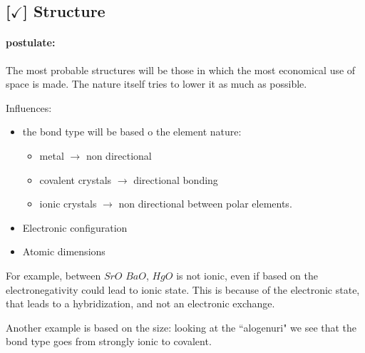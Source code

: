 \subsection{[$\checkmark$] Structure}

\paragraph{postulate:} The most probable structures will be those in which the most economical use of space is made. The nature itself tries to lower it as much as possible. 


Influences:

\begin{itemize}
    \item the bond type will be based o the element nature: 
    \begin{itemize}
        \item metal $\rightarrow$ non directional
        \item covalent crystals $\rightarrow$ directional bonding
        \item ionic crystals $\rightarrow$ non directional between polar elements.
    \end{itemize}
    \item Electronic configuration
    \item Atomic dimensions
\end{itemize}
%
For example, between $SrO$ $BaO$, $HgO$ is not ionic, even if based on the electronegativity could lead to ionic state. This is because of the electronic state, that leads to a hybridization, and not an electronic exchange.

\vspace*{10pt}

\noindent Another example is based on the size: looking at the ``alogenuri" we see that the bond type goes from strongly ionic to covalent.